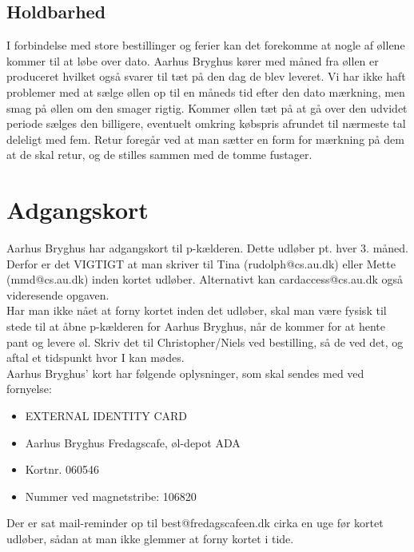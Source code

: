 \subsection{Holdbarhed}

I forbindelse med store bestillinger og ferier kan det forekomme at nogle af øllene kommer til at løbe over dato.
Aarhus Bryghus kører med måned fra øllen er produceret hvilket også svarer til tæt på den dag de blev leveret.
Vi har ikke haft problemer med at sælge øllen op til en måneds tid efter den dato mærkning, men smag på øllen
om den smager rigtig. Kommer øllen tæt på at gå over den udvidet periode sælges den billigere,
eventuelt omkring købspris afrundet til nærmeste tal deleligt med fem.
Retur foregår ved at man sætter en form for mærkning på dem at de skal retur, og de stilles sammen
med de tomme fustager.



\section{Adgangskort}
Aarhus Bryghus har adgangskort til p-kælderen. Dette udløber pt. hver 3. måned. Derfor er det VIGTIGT at man skriver til Tina (rudolph@cs.au.dk) eller Mette (mmd@cs.au.dk) inden kortet udløber. Alternativt kan cardaccess@cs.au.dk også videresende opgaven. \\
Har man ikke nået at forny kortet inden det udløber, skal man være fysisk til stede til at åbne p-kælderen for Aarhus Bryghus, når de kommer for at hente pant og levere øl. Skriv det til Christopher/Niels ved bestilling, så de ved det, og aftal et tidspunkt hvor I kan mødes. \\
Aarhus Bryghus' kort har følgende oplysninger, som skal sendes med ved fornyelse:
\begin{itemize}
    \item EXTERNAL IDENTITY CARD
    \item Aarhus Bryghus Fredagscafe, øl-depot ADA
    \item Kortnr. 060546
    \item Nummer ved magnetstribe: 106820
\end{itemize}
Der er sat mail-reminder op til best@fredagscafeen.dk cirka en uge før kortet udløber, sådan at man ikke glemmer at forny kortet i tide.



